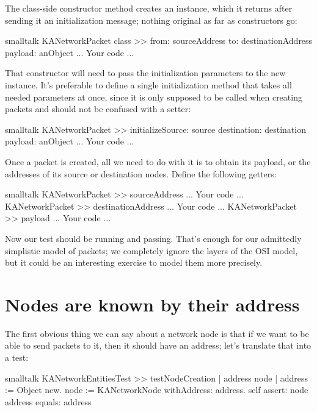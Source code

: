 \documentclass[10pt,twoside,english]{_support/latex/sbabook/sbabook}
\begin{document}
The class-side constructor method creates an instance, which it returns after sending it an initialization message; nothing original as far as constructors go:

\begin{displaycode}{smalltalk}
KANetworkPacket class >> from: sourceAddress to: destinationAddress payload: anObject
    ... Your code ...
\end{displaycode}

That constructor will need to pass the initialization parameters to the new instance.
It's preferable to define a single initialization method that takes all needed parameters at once, since it is only supposed to be called when creating packets and should not be confused with a setter:

\begin{displaycode}{smalltalk}
KANetworkPacket >> initializeSource: source destination: destination payload: anObject
    ... Your code ...
\end{displaycode}

Once a packet is created, all we need to do with it is to obtain its payload, or the addresses of its source or destination nodes.
Define the following getters:

\begin{displaycode}{smalltalk}
KANetworkPacket >> sourceAddress
	... Your code ...
KANetworkPacket >> destinationAddress
	... Your code ...
KANetworkPacket >> payload
	... Your code ...
\end{displaycode}

Now our test should be running and passing.
That's enough for our admittedly simplistic model of packets; we completely ignore the layers of the OSI model, but it could be an interesting exercise to model them more precisely.
\section{Nodes are known by their address}
The first obvious thing we can say about a network node is that if we want to be able to send packets to it, then it should have an address; let's translate that into a test:

\begin{displaycode}{smalltalk}
KANetworkEntitiesTest >> testNodeCreation
    | address node |
    address := Object new.
    node := KANetworkNode withAddress: address.
    self assert: node address equals: address
\end{displaycode}
\end{document}
